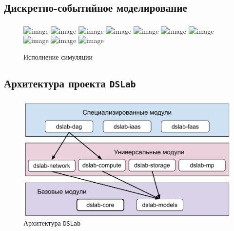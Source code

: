 \documentclass[t]{beamer}  %
\begin{document}
	\subsection{Дискретно-событийное моделирование}

    \begin{frame}
    \frametitle{\insertsection} 
	\framesubtitle{\insertsubsection}

	\begin{figure}
		\centering
		\includegraphics<1>[width=\linewidth]{images/event_pipeline_0}
		\includegraphics<2>[width=\linewidth]{images/event_pipeline_1}
		\includegraphics<3>[width=\linewidth]{images/event_pipeline_2}
		\includegraphics<4>[width=\linewidth]{images/event_pipeline_3}
		\includegraphics<5>[width=\linewidth]{images/event_pipeline_4}
		\includegraphics<6>[width=\linewidth]{images/event_pipeline_5}
		\includegraphics<7>[width=\linewidth]{images/event_pipeline_6}
		\includegraphics<8>[width=\linewidth]{images/event_pipeline_7}
		\includegraphics<9>[width=\linewidth]{images/event_pipeline_8}
		\includegraphics<10>[width=\linewidth]{images/event_pipeline_9}
		\label{simulation}
		\caption*{Исполнение симуляции}
	\end{figure}
    \end{frame}

	\subsection{Архитектура проекта \texttt{DSLab}}
	\begin{frame}
		\frametitle{\insertsection} 
		\framesubtitle{\insertsubsection}

		\begin{figure}[H]
			\centering
			\includegraphics[width=0.9\linewidth]{images/dslab_arc}
			\caption*{Архитектура \texttt{DSLab}}
			\label{dslab_arc}
		\end{figure}
	\end{frame}
\end{document}
